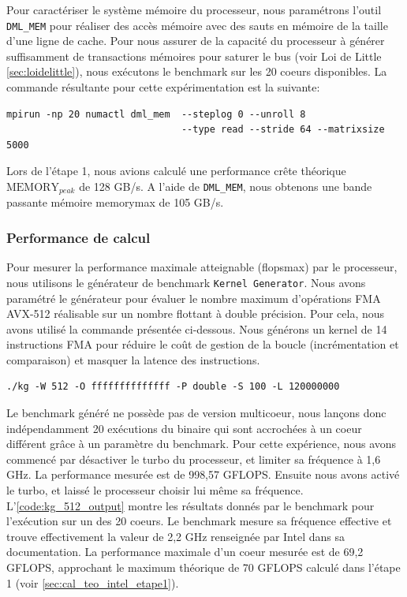         Pour caractériser le système mémoire du processeur, nous paramétrons l'outil \verb=DML_MEM= pour réaliser des accès mémoire avec des sauts en mémoire de la taille d'une ligne de cache.
        Pour nous assurer de la capacité du processeur à générer suffisamment de transactions mémoires pour saturer le bus (voir Loi de Little \autoref{sec:loidelittle}), nous exécutons le benchmark sur les 20 coeurs disponibles. La commande résultante pour cette expérimentation est la suivante:
\begin{lstlisting}
mpirun -np 20 numactl dml_mem  --steplog 0 --unroll 8 
                               --type read --stride 64 --matrixsize 5000
\end{lstlisting}
        Lors de l'étape 1, nous avions calculé une performance crête théorique $\text{MEMORY}_{peak}$ de 128 GB/s. A l'aide de \verb=DML_MEM=, nous obtenons une bande passante mémoire \gls{memorymax} de 105 GB/s.
        
    
    
    \subsubsection{Performance de calcul}
    
        Pour mesurer la performance maximale atteignable (\gls{flopsmax}) par le processeur, nous utilisons le générateur de benchmark \verb|Kernel Generator|. Nous avons paramétré le générateur pour évaluer le nombre maximum d'opérations \gls{FMA} AVX-512 réalisable sur un nombre flottant à double précision. Pour cela, nous avons utilisé la commande présentée ci-dessous. Nous générons un kernel de 14 instructions FMA pour réduire le coût de gestion de la boucle (incrémentation et comparaison) et masquer la latence des instructions.

\begin{lstlisting}
./kg -W 512 -O ffffffffffffff -P double -S 100 -L 120000000
\end{lstlisting}
        
        Le benchmark généré ne possède pas de version multicoeur, nous lançons donc indépendamment 20 exécutions du binaire qui sont accrochées à un coeur différent grâce à un paramètre du benchmark. Pour cette expérience, nous avons commencé par désactiver le turbo du processeur, et limiter sa fréquence à 1,6 GHz. La performance mesurée est de 998,57 GFLOPS. Ensuite nous avons activé le turbo, et laissé le processeur choisir lui même sa fréquence. L'\autoref{code:kg_512_output} montre les résultats donnés par le benchmark pour l'exécution sur un des 20 coeurs. Le benchmark mesure sa fréquence effective et trouve effectivement la valeur de 2,2 GHz renseignée par Intel dans sa documentation. La performance maximale d'un coeur mesurée est de 69,2 GFLOPS, approchant le maximum théorique de 70 GFLOPS calculé dans l'étape 1 (voir \autoref{sec:cal_teo_intel_etape1}).\\
        
